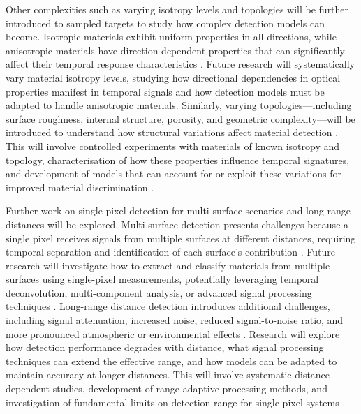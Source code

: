 \documentclass[12pt,a4paper,oneside]{report}
\begin{document}
Other complexities such as varying isotropy levels and topologies will be further introduced to sampled targets to study how complex detection models can become. Isotropic materials exhibit uniform properties in all directions, while anisotropic materials have direction-dependent properties that can significantly affect their temporal response characteristics \cite{elachi2021,schott2007}. Future research will systematically vary material isotropy levels, studying how directional dependencies in optical properties manifest in temporal signals and how detection models must be adapted to handle anisotropic materials. Similarly, varying topologies—including surface roughness, internal structure, porosity, and geometric complexity—will be introduced to understand how structural variations affect material detection \cite{su2016,becker2023}. This will involve controlled experiments with materials of known isotropy and topology, characterisation of how these properties influence temporal signatures, and development of models that can account for or exploit these variations for improved material discrimination \cite{tafone2023}.

Further work on single-pixel detection for multi-surface scenarios and long-range distances will be explored. Multi-surface detection presents challenges because a single pixel receives signals from multiple surfaces at different distances, requiring temporal separation and identification of each surface's contribution \cite{jungerman2022,turpin2019}. Future research will investigate how to extract and classify materials from multiple surfaces using single-pixel measurements, potentially leveraging temporal deconvolution, multi-component analysis, or advanced signal processing techniques \cite{koerner2021,tontini2020}. Long-range distance detection introduces additional challenges, including signal attenuation, increased noise, reduced signal-to-noise ratio, and more pronounced atmospheric or environmental effects \cite{koerner2021}. Research will explore how detection performance degrades with distance, what signal processing techniques can extend the effective range, and how models can be adapted to maintain accuracy at longer distances. This will involve systematic distance-dependent studies, development of range-adaptive processing methods, and investigation of fundamental limits on detection range for single-pixel systems \cite{moramartin2021,yang2024}.
\end{document}
